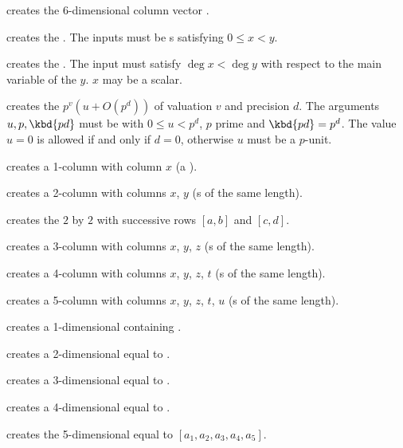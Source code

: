 creates the $6$-dimensional column vector \kbd{[x,y,z,t,u,v]~}.

 creates the  .
The inputs must be s satisfying $0 \leq x < y$.

 creates the  .
The input must satisfy $\deg x < \deg y$ with respect to the main variable of
the  $y$. $x$ may be a scalar.

 creates the
 $p^v(u + O(p^d))$ of valuation $v$ and precision $d$.
The arguments $u, p, \kbd{pd}$ must be  with $0 \leq u < p^d$,
$p$ prime and $\kbd{pd} = p^d$. The value $u = 0$ is allowed if and only if
$d = 0$, otherwise $u$ must be a $p$-unit.

 creates a 1-column  with column $x$
(a ).

 creates a 2-column  with columns
$x$, $y$ (s of the same length).

 creates the $2$ by $2$
 with successive rows $[a,b]$ and $[c,d]$.

 creates a 3-column  with columns
$x$, $y$, $z$ (s of the same length).

 creates a 4-column 
with columns $x$, $y$, $z$, $t$ (s of the same length).

 creates a 5-column
 with columns $x$, $y$, $z$, $t$, $u$ (s of the same
length).

 creates a 1-dimensional  containing .

 creates a 2-dimensional  equal to
\kbd{[x,y]}.

 creates a 3-dimensional 
equal to \kbd{[x,y,z]}.

 creates a 4-dimensional 
equal to \kbd{[x,y,z,t]}.

 creates the
5-dimensional  equal to $[a_1,a_2,a_3,a_4,a_5]$.

